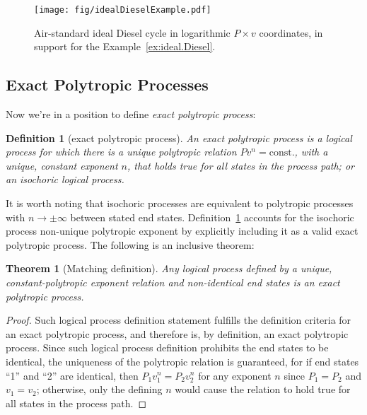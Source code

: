 \documentclass[fleqn,10pt]{SelfArx}
\newtheorem{theorem}{Theorem}
\newtheorem{definition}{Definition}
\begin{document}
    \begin{figure}[ht]
        \centering
        \texttt{[image: fig/idealDieselExample.pdf]}
        \caption{Air-standard ideal Diesel cycle in  logarithmic  $P\times  v$  coordinates,  in
            support for the Example~\ref{ex:ideal.Diesel}.}
        \label{fig:cycle.Diesel}
    \end{figure}

    \subsection{Exact Polytropic Processes}

    Now we're in a position to define \emph{exact polytropic process}:

    \begin{definition}[exact polytropic process]\label{def:exact.poly.proc}
        An exact polytropic process is a logical process for which there is a unique  polytropic
        relation $Pv^n = \mbox{const.}$, with a unique, constant exponent $n$, that  holds  true
        for all states in the process path; or an isochoric logical process.
    \end{definition}

    It is worth noting that isochoric processes are equivalent to polytropic processes  with  $n
    \to \pm\infty$ between stated end states. Definition~\ref{def:exact.poly.proc} accounts  for
    the isochoric process non-unique polytropic exponent by explicitly including it as  a  valid
    exact polytropic process. The following is an inclusive theorem:

    \begin{theorem}[Matching definition]\label{theo:matching.def}
        Any logical process defined by  a  unique,  constant-polytropic  exponent  relation  and
        non-identical end states is an exact polytropic process.
    \end{theorem}

    \begin{proof}
        Such logical process definition statement fulfills the definition criteria for an  exact
        polytropic process, and therefore is, by definition, an exact polytropic process.  Since
        such logical process definition prohibits the end states to be identical, the uniqueness
        of the polytropic relation is  guaranteed,  for  if  end  states  ``1''  and  ``2''  are
        identical, then $P_1v_1^n = P_2v_2^n$ for any exponent $n$ since $P_1 = P_2$ and $v_1  =
        v_2$; otherwise, only the defining $n$ would cause the relation to  hold  true  for  all
        states in the process path.
    \end{proof}
\end{document}
